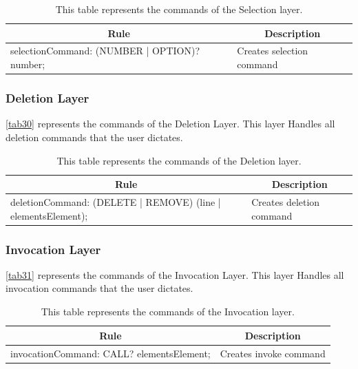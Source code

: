 \begin{table}[H]
	\centering
	\begin{tabular}{|p{8cm}|p{7cm}|}
		\hline
		\multicolumn{1}{|c|}{{\bf Rule}}             & \multicolumn{1}{c|}{{\bf Description}} \\ \hline
		selectionCommand: (NUMBER | OPTION)? number; & Creates selection command              \\ \hline
	\end{tabular}
		\caption{This table represents the commands of the Selection layer.}
		\label{tab29}
\end{table}

\subsubsection{Deletion Layer}
\autoref{tab30} represents the commands of the Deletion Layer.  This layer Handles all deletion commands that the user dictates.

\begin{table}[H]
	\centering
	\begin{tabular}{|p{8cm}|p{7cm}|}
		\hline
		\multicolumn{1}{|c|}{{\bf Rule}}                             & \multicolumn{1}{c|}{{\bf Description}} \\ \hline
		deletionCommand: (DELETE | REMOVE) (line | elementsElement); & Creates deletion command               \\ \hline
	\end{tabular}
		\caption{This table represents the commands of the Deletion layer.}
		\label{tab30}
\end{table}

\subsubsection{Invocation Layer}
\autoref{tab31} represents the commands of the Invocation Layer.  This layer Handles all invocation commands that the user dictates.

\begin{table}[H]
	\centering
	\begin{tabular}{|p{8cm}|p{7cm}|}
		\hline
		\multicolumn{1}{|c|}{{\bf Rule}}          & \multicolumn{1}{c|}{{\bf Description}} \\ \hline
		invocationCommand: CALL? elementsElement; & Creates invoke command                 \\ \hline
	\end{tabular}
		\caption{This table represents the commands of the Invocation layer.}
		\label{tab31}
\end{table}

